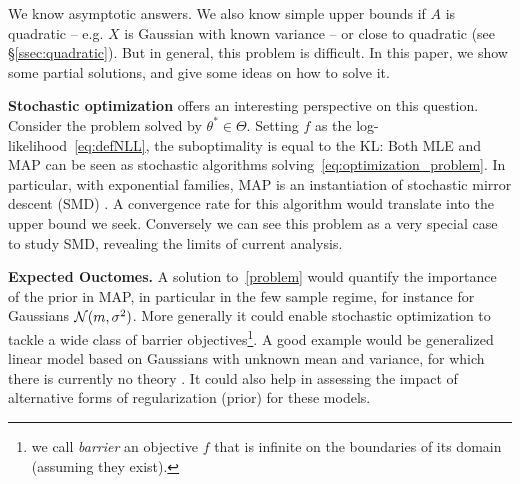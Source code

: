 \documentclass[twoside]{article}
\newcommand{\logpart}{A}
\newcommand{\nat}{\theta}
\begin{document}
We know asymptotic answers.
We also know simple upper bounds if $\logpart$ is quadratic -- e.g. $X$ is Gaussian with known variance --
or close to quadratic (see \S\ref{ssec:quadratic}).
But in general, this problem is difficult. In this paper, we show some partial solutions, and give some ideas on how to solve it.


{\bf Stochastic optimization} offers an interesting perspective on this question.
Consider the problem
solved by $\nat^*\in \Theta$.
Setting $f$ as the log-likelihood~\eqref{eq:defNLL}, the suboptimality is equal to the KL:
\alignn{
	f(\nat) - f(\nat^*) = \KL\paren{p_{\nat^*} || p_{\nat} }
	\label{eq:suboptimalityKL}
}
Both MLE and MAP can be seen as stochastic algorithms solving~\eqref{eq:optimization_problem}.
In particular, with exponential families, MAP is an instantiation of stochastic mirror descent (SMD) \citep{nemirovski2009robust}.
A convergence rate for this algorithm would translate into the upper bound we seek.
Conversely we can see this problem as a very special case to study SMD, revealing the limits of current analysis.

{\bf Expected Ouctomes.}
A solution to~\eqref{problem} would quantify the importance of the prior in MAP, in particular in the few sample regime, for instance for Gaussians ${\mathcal N}(m,\sigma^2)$. 
More generally it could enable stochastic optimization to tackle a wide class of barrier objectives\footnote{we call \emph{barrier} an objective $f$ that is infinite on the boundaries of its domain (assuming they exist).}.
A good example would be generalized linear model based on Gaussians with unknown mean and variance, for which there is currently no theory \citep{bach2013nonstronglyconvex}.
It could also help in assessing the impact of alternative forms of regularization (prior) for these models. 
\end{document}
